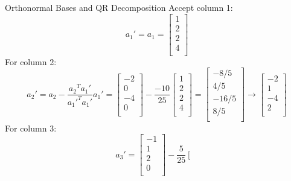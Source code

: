 \documentclass{beamer}
\begin{document}
\begin{frame}{Orthonormal Bases and QR Decomposition}
Accept column 1:
\begin{equation*}
    a_1'=a_1=\left[ \begin{array}{c}
        1\\
        2\\
        2\\
        4\\
    \end{array} \right]
\end{equation*}
For column 2:
\begin{equation*}
    a_2'=a_2-\frac{{a_2}^Ta_1'}{a_1'^Ta_1'}a_1'=\left[ \begin{array}{c}
        -2\\
        0\\
        -4\\
        0\\
    \end{array} \right] -\frac{-10}{25}\left[ \begin{array}{c}
        1\\
        2\\
        2\\
        4\\
    \end{array} \right] =\left[ \begin{array}{c}
        -8/5\\
        4/5\\
        -16/5\\
        8/5\\
    \end{array} \right] \rightarrow \left[ \begin{array}{c}
        -2\\
        1\\
        -4\\
        2\\
    \end{array} \right]
\end{equation*}
For column 3:
\begin{equation*}
    a_3'=\left[ \begin{array}{c}
        -1\\
        1\\
        2\\
        0\\
    \end{array} \right] -\frac{5}{25}\left[ \begin{array}{c}

\end{array}
\end{equation*}
\end{frame}
\end{document}
